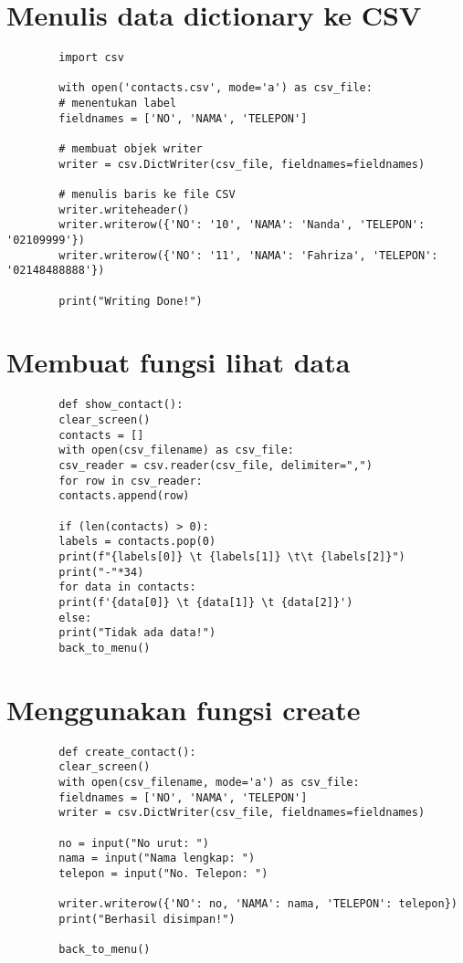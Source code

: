 \documentclass{article}
\begin{document}
	\section{ Menulis data dictionary ke CSV}
	\begin{lstlisting}
		import csv
		
		with open('contacts.csv', mode='a') as csv_file:
		# menentukan label
		fieldnames = ['NO', 'NAMA', 'TELEPON']
		
		# membuat objek writer
		writer = csv.DictWriter(csv_file, fieldnames=fieldnames)
		
		# menulis baris ke file CSV
		writer.writeheader()
		writer.writerow({'NO': '10', 'NAMA': 'Nanda', 'TELEPON': '02109999'})
		writer.writerow({'NO': '11', 'NAMA': 'Fahriza', 'TELEPON': '02148488888'})
		
		print("Writing Done!")
	\end{lstlisting}

	\section{Membuat fungsi lihat data}
	\begin{lstlisting}
		def show_contact():
		clear_screen()
		contacts = []
		with open(csv_filename) as csv_file:
		csv_reader = csv.reader(csv_file, delimiter=",")
		for row in csv_reader:
		contacts.append(row)
		
		if (len(contacts) > 0):
		labels = contacts.pop(0)
		print(f"{labels[0]} \t {labels[1]} \t\t {labels[2]}")
		print("-"*34)
		for data in contacts:
		print(f'{data[0]} \t {data[1]} \t {data[2]}')
		else:
		print("Tidak ada data!")
		back_to_menu()
	\end{lstlisting}

	\section{Menggunakan fungsi create}
	\begin{lstlisting}
		def create_contact():
		clear_screen()
		with open(csv_filename, mode='a') as csv_file:
		fieldnames = ['NO', 'NAMA', 'TELEPON']
		writer = csv.DictWriter(csv_file, fieldnames=fieldnames)
		
		no = input("No urut: ")
		nama = input("Nama lengkap: ")
		telepon = input("No. Telepon: ")
		
		writer.writerow({'NO': no, 'NAMA': nama, 'TELEPON': telepon})    
		print("Berhasil disimpan!")
		
		back_to_menu()
	\end{lstlisting}
\end{document}
